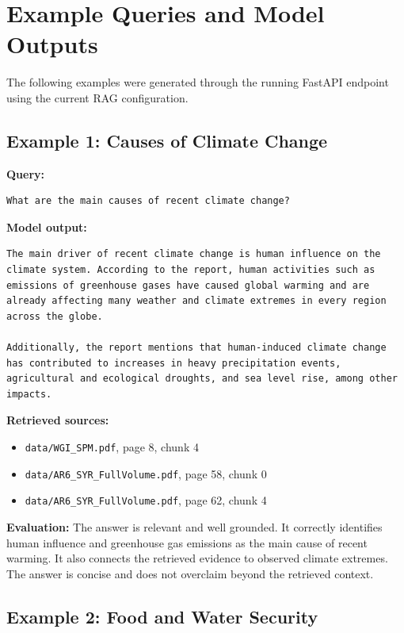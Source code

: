 \documentclass[11pt,a4paper]{article}
\begin{document}
\section{Example Queries and Model Outputs}

The following examples were generated through the running FastAPI endpoint using the current RAG configuration.

\subsection{Example 1: Causes of Climate Change}

\textbf{Query:}
\begin{lstlisting}
What are the main causes of recent climate change?
\end{lstlisting}

\textbf{Model output:}
\begin{lstlisting}
The main driver of recent climate change is human influence on the climate system. According to the report, human activities such as emissions of greenhouse gases have caused global warming and are already affecting many weather and climate extremes in every region across the globe.

Additionally, the report mentions that human-induced climate change has contributed to increases in heavy precipitation events, agricultural and ecological droughts, and sea level rise, among other impacts.
\end{lstlisting}

\textbf{Retrieved sources:}
\begin{itemize}
    \item \texttt{data/WGI\_SPM.pdf}, page 8, chunk 4
    \item \texttt{data/AR6\_SYR\_FullVolume.pdf}, page 58, chunk 0
    \item \texttt{data/AR6\_SYR\_FullVolume.pdf}, page 62, chunk 4
\end{itemize}

\textbf{Evaluation:} The answer is relevant and well grounded. It correctly identifies human influence and greenhouse gas emissions as the main cause of recent warming. It also connects the retrieved evidence to observed climate extremes. The answer is concise and does not overclaim beyond the retrieved context.

\subsection{Example 2: Food and Water Security}
\end{document}
